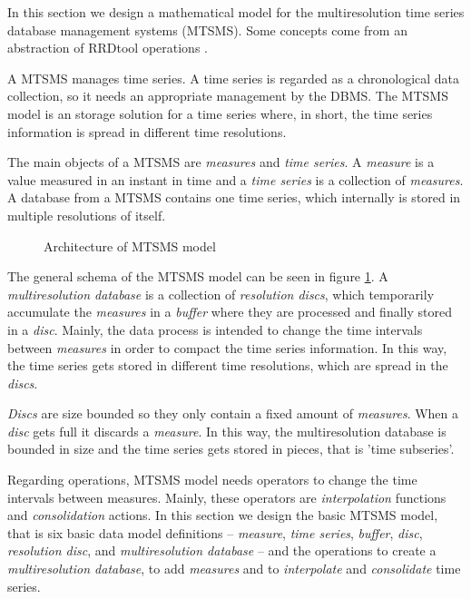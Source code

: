 \label{sec:MTSMS}

In this section we design a mathematical model for the multiresolution time series database management systems (MTSMS). Some concepts come from an abstraction of RRDtool operations \cite{rrdtool}. 

A MTSMS manages time series. A time series is regarded as a chronological data collection, so it needs an appropriate management by the DBMS.
The MTSMS model is an storage solution for a time series where, in short,  the time series information is spread in different time resolutions. 

The main objects of a MTSMS are \emph{measures} and \emph{time series}. A \emph{measure} is a value measured in an instant in time and a  \emph{time series} is a collection of \emph{measures}. A database from a MTSMS contains one time series, which internally is stored in multiple resolutions of itself.

\begin{figure}[tp]
\centering
\setlength{\unitlength}{0.3mm}

\caption{Architecture of MTSMS model}
\label{fig:model:mtsdb}
\end{figure}

The general schema of the MTSMS model can be seen in figure \ref{fig:model:mtsdb}.  A \emph{multiresolution database} is a collection of \emph{resolution discs}, which temporarily accumulate the \emph{measures} in a \emph{buffer} where they are processed and finally stored in a \emph{disc}. Mainly, the data process is intended to change the time intervals between \emph{measures} in order to compact the time series information. In this way, the time series gets stored in different time resolutions, which are spread in the \emph{discs}.

\emph{Discs} are size bounded so they only contain a fixed amount of \emph{measures}. When a \emph{disc} gets full it discards a \emph{measure}. In this way, the multiresolution database is bounded in size and the time series gets stored in pieces, that is 'time subseries'.







Regarding operations, MTSMS model needs operators to change the time intervals between measures. Mainly, these operators are \emph{interpolation} functions and \emph{consolidation} actions. In this section we design the basic MTSMS model, that is six basic data model definitions -- \emph{measure}, \emph{time series}, \emph{buffer}, \emph{disc}, \emph{resolution disc}, and \emph{multiresolution database} -- and the operations to create a \emph{multiresolution database}, to add \emph{measures} and to \emph{interpolate} and \emph{consolidate} time series.







